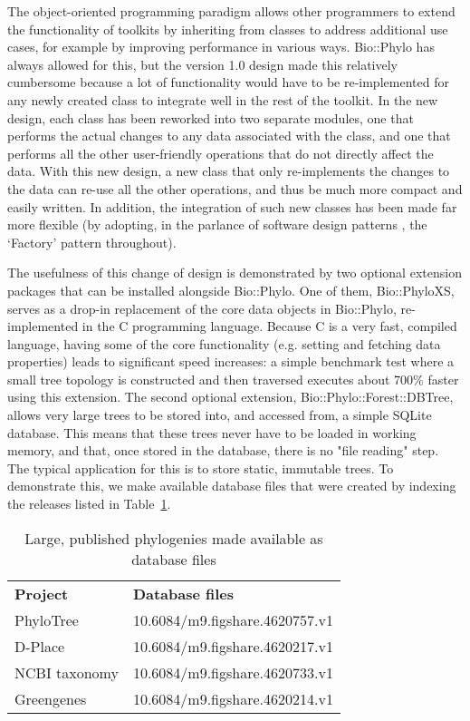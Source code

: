 \documentclass{bioinfo}
\begin{document}
The object-oriented programming paradigm allows other programmers to extend the 
functionality of toolkits by inheriting from classes to address additional use cases, for 
example by improving performance in various ways. Bio::Phylo has always allowed for this, 
but the version 1.0 design made this relatively cumbersome because a lot of functionality 
would have to be re-implemented for any newly created class to integrate well in the rest 
of the toolkit. In the new design, each class has been reworked into two separate modules, 
one that performs the actual changes to any data associated with the class, and one that 
performs all the other user-friendly operations that do not directly affect the data. With 
this new design, a new class that only re-implements the changes to the data can re-use 
all the other operations, and thus be much more compact and easily written. In addition, 
the integration of such new classes has been made far more flexible (by adopting, in the 
parlance of software design patterns \citep{Gamma1995}, the `Factory' pattern throughout).

The usefulness of this change of design is demonstrated by two optional extension packages
that can be installed alongside Bio::Phylo. One of them, Bio::PhyloXS, serves as a drop-in
replacement of the core data objects in Bio::Phylo, re-implemented in the C programming
language. Because C is a very fast, compiled language, having some of the core 
functionality (e.g. setting and fetching data properties) leads to significant speed 
increases: a simple benchmark test where a small tree topology is constructed and then
traversed executes about 700\% faster using this extension. The second optional extension,
Bio::Phylo::Forest::DBTree, allows very large trees to be stored into, and accessed from,
a simple SQLite database. This means that these trees never have to be loaded in working
memory, and that, once stored in the database, there is no "file reading" step. The 
typical application for this is to store static, immutable trees. To demonstrate this, we
make available database files that were created by indexing the releases listed in 
Table~\ref{table1}.

\begin{table}[]
\centering
\caption{Large, published phylogenies made available as database files}
\label{table1}
\begin{tabular}{ll}
\textbf{Project}                   & \textbf{Database files}                 \\
PhyloTree \citep{Oven2009}         & {\small 10.6084/m9.figshare.4620757.v1} \\
D-Place \citep{Kirby2016}          & {\small 10.6084/m9.figshare.4620217.v1} \\
NCBI taxonomy \citep{Federhen2011} & {\small 10.6084/m9.figshare.4620733.v1} \\
Greengenes \citep{Desantis2006}    & {\small 10.6084/m9.figshare.4620214.v1}
\end{tabular}
\end{table}
\end{document}
